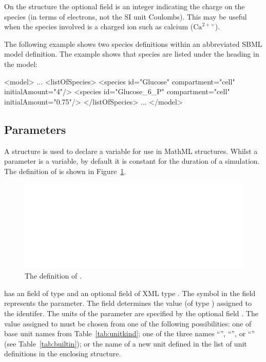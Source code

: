 \documentclass[10pt,twocolumntoc]{cekarticle}
\newcommand{\vref}[1]{\ref{#1}}
\begin{document}
On the  structure the optional field  is an integer indicating the charge on the species (in terms of electrons, not the SI unit Coulombs). This may be useful when the species involved is a charged ion such as calcium ($\text{Ca}^{2++}$).

The following example shows two species definitions within an
abbreviated SBML model definition.  The example shows that species
are listed under the heading  in the model:

\begin{example}
<model>
    ...
    <listOfSpecies>
        <species id="Glucose" compartment="cell" initialAmount="4"/>
        <species id="Glucose_6_P" compartment="cell" initialAmount="0.75"/>
    </listOfSpecies>
    ...
</model>

\end{example}

\subsection{Parameters}
\label{sec:parameters}

A  structure is used to declare a variable for
use in MathML structures. Whilst a parameter is a variable, by
default it is constant for the duration of a simulation.  The
definition of  is shown in
Figure~\vref{fig:parameter}.

\begin{figure}[htb]
  \centering
  \includegraphics[scale = 0.68]{parameter}
  \caption{The definition of .}
  \label{fig:parameter}
\end{figure}

 has an  field of type  and
an optional  field of XML type . The
symbol in the  field represents the parameter.  The
field  determines the value (of type )
assigned to the identifer.  The units of the parameter
 are specified by the optional field .
The value assigned to  must be chosen from one of
the following possibilities: one of base unit names from
Table~\vref{tab:unitkind}; one of the three names
``'', ``'', or
``'' (see Table~\ref{tab:builtin}); or the name of
a new unit defined in the list of unit definitions in the
enclosing  structure.
\end{document}

